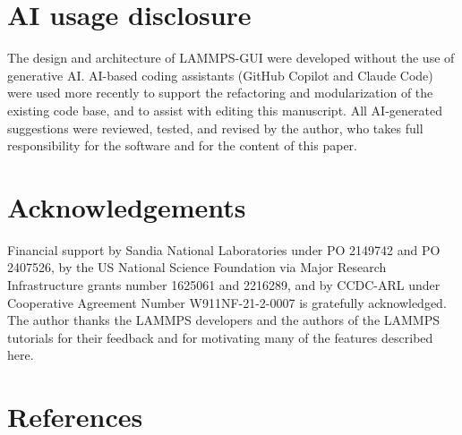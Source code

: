 \documentclass[
]{article}
\begin{document}
\section{AI usage disclosure}\label{ai-usage-disclosure}

The design and architecture of LAMMPS-GUI were developed without the use
of generative AI. AI-based coding assistants (GitHub Copilot and Claude
Code) were used more recently to support the refactoring and
modularization of the existing code base, and to assist with editing
this manuscript. All AI-generated suggestions were reviewed, tested, and
revised by the author, who takes full responsibility for the software
and for the content of this paper.

\section{Acknowledgements}\label{acknowledgements}

Financial support by Sandia National Laboratories under PO 2149742 and
PO 2407526, by the US National Science Foundation via Major Research
Infrastructure grants number 1625061 and 2216289, and by CCDC-ARL under
Cooperative Agreement Number W911NF-21-2-0007 is gratefully
acknowledged. The author thanks the LAMMPS developers and the authors of
the LAMMPS tutorials for their feedback and for motivating many of the
features described here.

\section*{References}\label{references}
\end{document}
